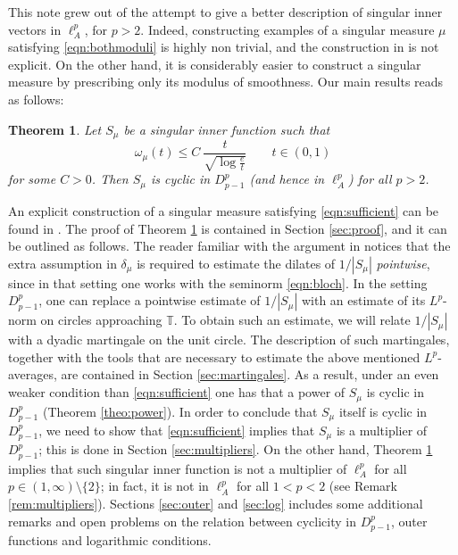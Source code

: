 \documentclass{birkjour}
\numberwithin{equation}{section}
\theoremstyle{plain}
\newtheorem{theo}{Theorem}[section]
\theoremstyle{definition}
\newcommand{\T}{\mathbb{T}}
\newcommand{\1}{\mathds{1}}
\begin{document}
This note grew out of the attempt to give a better description of singular inner vectors in $\ell^p_A$, for $p>2$. Indeed, constructing examples of a singular measure $\mu$ satisfying \eqref{eqn:bothmoduli} is highly non trivial, and the construction in \cite{Anderson91} is not explicit. On the other hand, it is considerably easier to construct a singular measure by prescribing only its modulus of smoothness. Our main results reads as follows:
\begin{theo}
\label{theo:main}
Let  $S_\mu$ be a singular inner function such that 
\begin{equation}
\label{eqn:sufficient}
\omega_\mu(t)\leq C~\frac{t}{\sqrt{\log\frac{e}{t}}}\qquad t\in(0, 1)
\end{equation}
for some $C>0$. Then $S_\mu$ is cyclic in $D^p_{p-1}$ (and hence in $\ell^p_A$) for all $p>2$.
\end{theo}
An explicit construction of a singular measure satisfying \eqref{eqn:sufficient} can be found in \cite[Th. II]{Shapiro68}. The proof of Theorem \ref{theo:main} is contained in Section \ref{sec:proof}, and it can be outlined as follows. The reader familiar with the argument in \cite{Anderson91} notices that the extra assumption in $\delta_\mu$ is required to estimate the dilates of $1/|S_\mu|$ \emph{pointwise}, since in that setting one works with the seminorm \eqref{eqn:bloch}. In the setting $D^p_{p-1}$, one can replace a pointwise estimate of $1/|S_\mu|$ with an estimate of its $L^p$-norm on circles approaching $\T$. To obtain such an estimate, we will relate $1/|S_\mu|$ with a dyadic martingale on the unit circle. The description of such martingales, together with the tools that are necessary to estimate the above mentioned $L^p$-averages, are contained in Section \ref{sec:martingales}. As a result, under an even weaker condition than \eqref{eqn:sufficient} one has that a power of $S_\mu$ is cyclic in $D^p_{p-1}$ (Theorem \ref{theo:power}). In order to conclude that $S_\mu$ itself is cyclic in $D^p_{p-1}$, we need to show that \eqref{eqn:sufficient} implies that $S_\mu$ is a multiplier of $D^p_{p-1}$; this is done in Section \ref{sec:multipliers}. On the other hand, Theorem \ref{theo:main} implies that such singular inner function is not a multiplier of $\ell^p_A$ for all $p\in(1, \infty)\setminus\{2\}$; in fact, it is not in $\ell^p_A$ for all $1<p<2$ (see Remark \ref{rem:multipliers}). Sections \ref{sec:outer} and \ref{sec:log} includes some additional remarks and open problems on the relation between cyclicity in $D^p_{p-1}$, outer functions and logarithmic conditions.\\
\end{document}
